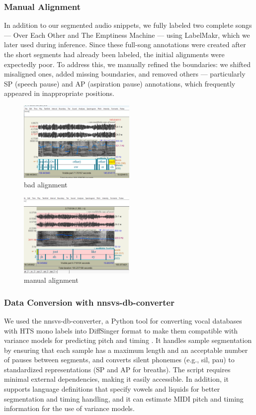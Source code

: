 \documentclass[a4paper]{article}
\begin{document}
\subsubsection{Manual Alignment}
In addition to our segmented audio snippets, we fully labeled two complete songs — Over Each Other and The Emptiness Machine — using LabelMakr, which we later used during inference. Since these full-song annotations were created after the short segments had already been labeled, the initial alignments were expectedly poor. To address this, we manually refined the boundaries: we shifted misaligned ones, added missing boundaries, and removed others — particularly SP (speech pause) and AP (aspiration pause) annotations, which frequently appeared in inappropriate positions.

\begin{figure}[htbp]
    \centering
    \includegraphics[width=0.5\textwidth]{graphics/bad_alignment.png}
    \caption{bad alignment}
    \label{fig:bild2}
\end{figure}

\begin{figure}[htbp]
    \centering
    \includegraphics[width=0.5\textwidth]{graphics/manual_alignment.png}
    \caption{manual alignment}
    \label{fig:bild3}
\end{figure}

\subsubsection{Data Conversion with nnsvs-db-converter}
We used the nnsvs-db-converter, a Python tool for converting vocal databases with HTS mono labels into DiffSinger format to make them compatible with variance models for predicting pitch and timing \cite{nnsvsdbconverter}. It handles sample segmentation by ensuring that each sample has a maximum length and an acceptable number of pauses between segments, and converts silent phonemes (e.g., sil, pau) to standardized representations (SP and AP for breaths). The script requires minimal external dependencies, making it easily accessible. In addition, it supports language definitions that specify vowels and liquids for better segmentation and timing handling, and it can estimate MIDI pitch and timing information for the use of variance models.
\end{document}
